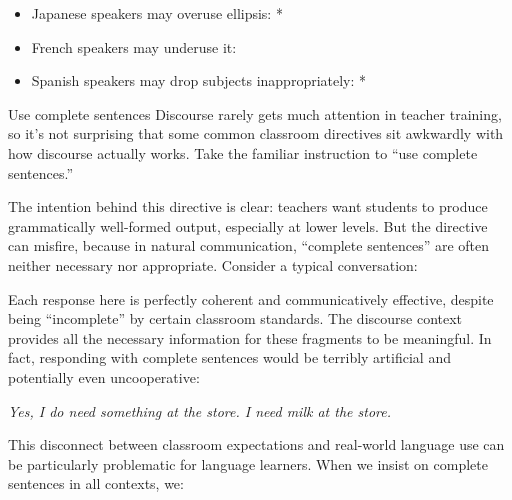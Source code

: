 \begin{itemize}[noitemsep]
\item Japanese speakers may overuse ellipsis: *
\item French speakers may underuse it: 
\item Spanish speakers may drop subjects inappropriately: *
\end{itemize}

\begin{tblsframed}{Use complete sentences}\label{sec:complete-sentences}
Discourse rarely gets much attention in teacher training, so it's not surprising that some common classroom directives sit awkwardly with how discourse actually works. Take the familiar instruction to \enquote{use complete sentences.}

\phantom{~~~~}The intention behind this directive is clear: teachers want students to produce grammatically well-formed output, especially at lower levels. But the directive can misfire, because in natural communication, \enquote{complete sentences} are often neither necessary nor appropriate. Consider a typical conversation:

\begin{dialogue}
   \item[A] 
   \item[B] 
   \item[A] 
\end{dialogue}

Each response here is perfectly coherent and communicatively effective, despite being \enquote{incomplete} by certain classroom standards. The discourse context provides all the necessary information for these fragments to be meaningful. In fact, responding with complete sentences would be terribly artificial and potentially even uncooperative:

\begin{dialogue}
   \item[A] 
   \item[B] 
   \item[A] \textit{Yes, I do need something at the store. I need milk at the store.}
\end{dialogue}

This disconnect between classroom expectations and real-world language use can be particularly problematic for language learners. When we insist on complete sentences in all contexts, we:


\end{tblsframed}
